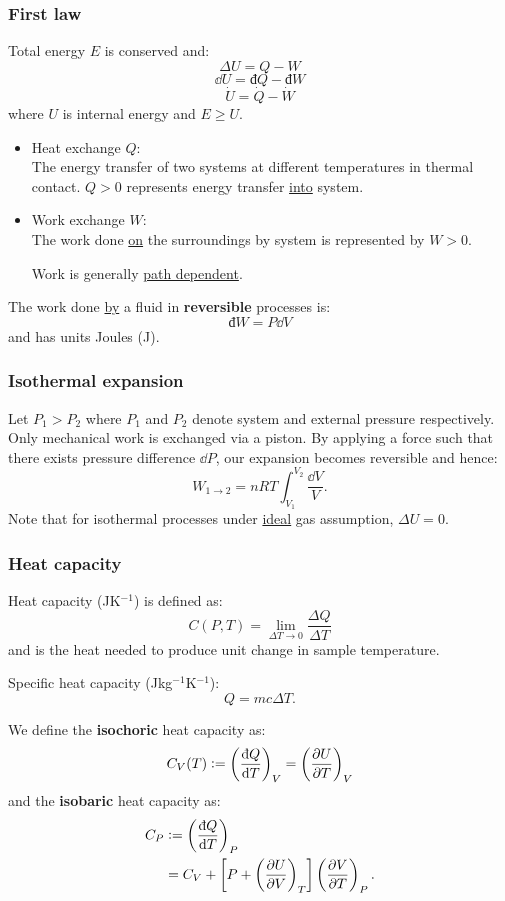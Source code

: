\documentclass{article}
\newcommand{\deq}{\vcentcolon=}
\newcommand{\idd}{\text{đ}}
\begin{document}
\begin{multicols*}{3}
\subsubsection*{First law}
Total energy $E$ is conserved and:
$$\Delta U=Q-W$$
$$\dd U=\idd Q-\idd W$$
$$\dot{U}=\dot{Q}-\dot{W}$$
where $U$ is internal energy and $E\geq U$.
\begin{itemize}
    \item Heat exchange $Q$: \\
    The energy transfer of two systems at
    different temperatures in thermal contact.
    $Q>0$ represents energy transfer
    \underline{into} system.

    \item Work exchange $W$: \\
    The work done \underline{on} the surroundings by system
    is represented by $W>0$.

    Work is generally \underline{path dependent}.
\end{itemize}

The work done \underline{by} a fluid
in \textbf{reversible} processes is:
$$\idd W=P\dd V$$
and has units Joules (J).

\subsubsection*{Isothermal expansion}
Let $P_1>P_2$ where $P_1$ and $P_2$ 
denote system and external
pressure respectively.
Only mechanical work is exchanged via
a piston.
By applying a force
such that there exists pressure difference $\dd P$, 
our expansion becomes
reversible and hence:
$$W_{1\rightarrow2}=nRT\int_{V_1}^{V_2}
\frac{\dd V}{V}.$$
Note that for isothermal processes
under \underline{ideal} gas assumption, $\Delta U=0$.

\subsubsection*{Heat capacity}
Heat capacity (JK$^{-1}$) is defined as:
$$C(P,T)=\lim_{\Delta T\rightarrow0}
\frac{\Delta Q}{\Delta T}$$
and is the heat needed to produce
unit change in sample temperature.

Specific heat capacity
(Jkg$^{-1}$K$^{-1}$):
$$Q=mc\Delta T.$$

We define the \textbf{isochoric} 
heat capacity as:
$$C_V(T)\deq\left(\frac{\idd Q}{\dd T}\right)_V
=\left(\frac{\partial U}{\partial T}\right)_V$$
and the \textbf{isobaric} heat capacity as:
\begin{align*}
    C_P
    &\deq\left(\frac{\idd Q}{\dd T}\right)_P \\
    &=C_V+\left[P+
    \left(\frac{\partial U}{\partial V}\right)_T\right]
    \left(\frac{\partial V}{\partial T}\right)_P.
\end{align*}


\end{multicols*}
\end{document}
